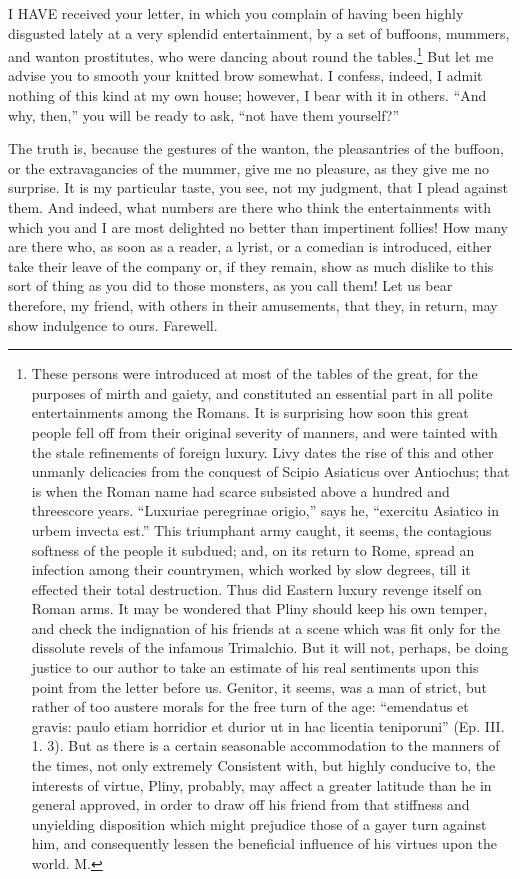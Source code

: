 I HAVE received your letter, in which you complain of having been highly
disgusted lately at a very splendid entertainment, by a set of buffoons,
mummers, and wanton prostitutes, who were dancing about round the tables.\footnote{These persons were
introduced at most of the tables of the great, for the purposes of mirth
and gaiety, and constituted an essential part in all polite entertainments
among the Romans. It is surprising how soon this great people fell off
from their original severity of manners, and were tainted with the stale
refinements of foreign luxury. Livy dates the rise of this and other
unmanly delicacies from the conquest of Scipio Asiaticus over Antiochus;
that is when the Roman name had scarce subsisted above a hundred and
threescore years. ``Luxuriae peregrinae origio,'' says he, ``exercitu
Asiatico in urbem invecta est.'' This triumphant army caught, it seems, the
contagious softness of the people it subdued; and, on its return to Rome,
spread an infection among their countrymen, which worked by slow degrees,
till it effected their total destruction. Thus did Eastern luxury revenge
itself on Roman arms. It may be wondered that Pliny should keep his own
temper, and check the indignation of his friends at a scene which was fit
only for the dissolute revels of the infamous Trimalchio. But it will not,
perhaps, be doing justice to our author to take an estimate of his real
sentiments upon this point from the letter before us. Genitor, it seems,
was a man of strict, but rather of too austere morals for the free turn of
the age: ``emendatus et gravis: paulo etiam horridior et durior ut in hac
licentia teniporuni'' (Ep. III. 1. 3). But as there is a certain seasonable
accommodation to the manners of the times, not only extremely Consistent
with, but highly conducive to, the interests of virtue, Pliny, probably,
may affect a greater latitude than he in general approved, in order to
draw off his friend from that stiffness and unyielding disposition which
might prejudice those of a gayer turn against him, and consequently lessen
the beneficial influence of his virtues upon the world. M.}
But let me advise you to smooth your knitted brow somewhat. I confess,
indeed, I admit nothing of this kind at my own house; however, I bear with
it in others. ``And why, then,'' you will be ready to ask, ``not have them
yourself?''

The truth is, because the gestures of the wanton, the pleasantries of the
buffoon, or the extravagancies of the mummer, give me no pleasure, as they
give me no surprise. It is my particular taste, you see, not my judgment,
that I plead against them. And indeed, what numbers are there who think
the entertainments with which you and I are most delighted no better than
impertinent follies! How many are there who, as soon as a reader, a
lyrist, or a comedian is introduced, either take their leave of the
company or, if they remain, show as much dislike to this sort of thing as
you did to those monsters, as you call them! Let us bear therefore, my
friend, with others in their amusements, that they, in return, may show
indulgence to ours. Farewell.

